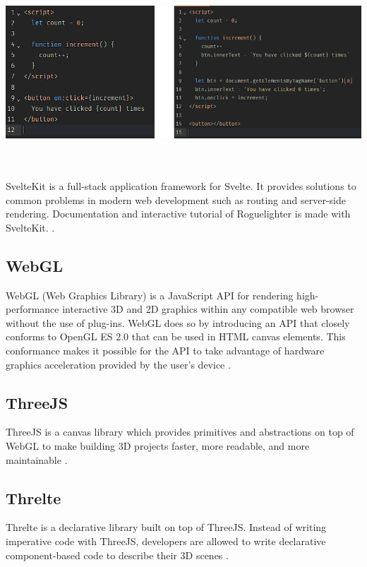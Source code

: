 \documentclass{article}
\begin{document}
\begin{minipage}{\linewidth}
    \centering
    \includegraphics[width=1\textwidth]{svelte-vs-vanilla.png}
\end{minipage}\\\\

SvelteKit is a full-stack application framework for Svelte. It provides solutions to common problems in modern web development such as routing and server-side rendering. Documentation and interactive tutorial of Roguelighter is made with SvelteKit. \cite{sveltekit}.

\subsection{WebGL}
WebGL (Web Graphics Library) is a JavaScript API for rendering high-performance interactive 3D and 2D graphics within any compatible web browser without the use of plug-ins. WebGL does so by introducing an API that closely conforms to OpenGL ES 2.0 that can be used in HTML canvas elements. This conformance makes it possible for the API to take advantage of hardware graphics acceleration provided by the user's device \cite{webgl}. 

\subsection{ThreeJS}
ThreeJS is a canvas library which provides primitives and abstractions on top of WebGL to make building 3D projects faster, more readable, and more maintainable \cite{threejs}.

\subsection{Threlte}
Threlte is a declarative library built on top of ThreeJS. Instead of writing imperative code with ThreeJS, developers are allowed to write declarative component-based code to describe their 3D scenes \cite{threlte}.
\end{document}
